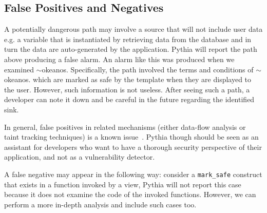 \subsection{False Positives and Negatives}
\label{sc:fa}

A potentially dangerous path
may involve a source that will
not include user data
e.g. a variable that is instantiated
by retrieving data from the database
and in turn the data are auto-generated
by the application.
Pythia will report the path above
producing a false alarm.
An alarm like this was produced
when we examined $\sim$okeanos.
Specifically,
the path involved the terms and
conditions of $\sim$okeanos.
which are marked as safe by
the template when they are
displayed to the user.
However,
such information is not useless.
After seeing such a path,
a developer can note it down and
be careful in the future regarding the
identified sink.

In general,
false positives in related mechanisms
(either data-flow analysis or
taint tracking techniques)
is a known issue~\cite{ME07, MLPK17}.
Pythia though should be seen
as an assistant for developers
who want to have a thorough
security perspective
of their application,
and not as a vulnerability detector.

A false negative may appear in the following
way: consider a {\tt mark\_safe} construct
that exists in a function invoked by a view,
Pythia will not report this case because
it does not examine the code of the invoked functions.
However, we can perform a more in-depth analysis and
include such cases too.
